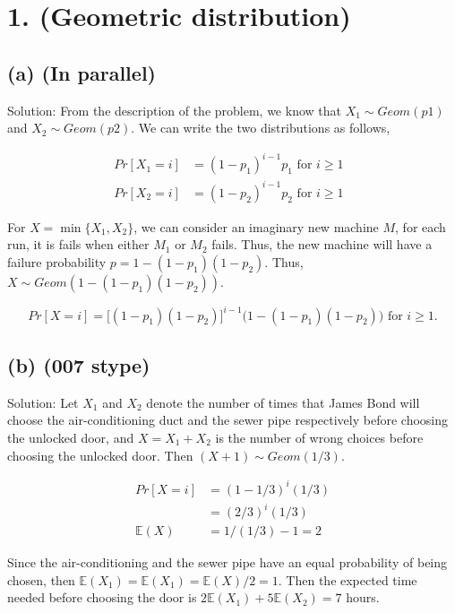 \documentclass[11pt]{537homework}
\author{Peilun Dai}
\begin{document}
\section*{1. (Geometric distribution) }



\subsection*{(a) (\textbf{In parallel})} 

Solution: From the description of the problem, we know that $X_1 \sim Geom(p1)$ and $X_2 \sim Geom(p2)$. We can write the two distributions as follows,

\begin{align*}
  Pr[X_1=i] & = (1-p_1)^{i-1}p_1 \text{ for $i \geq 1$ }\\
  Pr[X_2=i] & = (1-p_2)^{i-1}p_2 \text{ for $i \geq 1$ }
\end{align*}

For $X = \min{\{X_1, X_2\}}$, we can consider an imaginary new machine $M$, for each run, it is fails when either $M_1$ or $M_2$ fails. Thus, the new machine will have a failure probability $p = 1-(1-p_1)(1-p_2)$. Thus, $X \sim Geom(1-(1-p_1)(1-p_2))$.

$$
Pr[X=i] = \Big[(1-p_1)(1-p_2)\Big]^{i-1}\Big(1-(1-p_1)(1-p_2)\Big) \text{ for $i \geq 1$}.
$$


\subsection*{(b) (\textbf{007 stype})} 

Solution: Let $X_1$ and $X_2$ denote the number of times that James Bond will choose the air-conditioning duct and the sewer pipe respectively before choosing the unlocked door, and $X = X_1 + X_2$ is the number of wrong choices before choosing the unlocked door. Then $(X+1) \sim Geom(1/3)$. 

\begin{align*}
  Pr[X=i]     & = (1-1/3)^{i}(1/3) \\
              & = (2/3)^{i}(1/3) \\
\mathbb{E}(X) & = 1/(1/3)-1 = 2
\end{align*}

Since the air-conditioning and the sewer pipe have an equal probability of being chosen, then $\mathbb{E}(X_1) = \mathbb{E}(X_1) = \mathbb{E}(X)/2 = 1$. Then the expected time needed before choosing the door is $2\mathbb{E}(X_1) + 5\mathbb{E}(X_2) = 7$ hours. 
\end{document}
